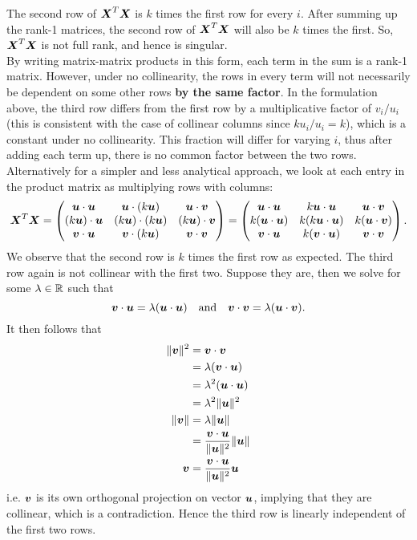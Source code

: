 \documentclass[12pt]{article}
\begin{document}
	The second row of $\boldsymbol{X}^T\boldsymbol{X}$ is $k$ times the first row for every $i$. After summing up the rank-1 matrices, the second row of $\boldsymbol{X}^T\boldsymbol{X}$ will also be $k$ times the first. So, $\boldsymbol{X}^T\boldsymbol{X}$ is not full rank, and hence is singular. \\
	
	By writing matrix-matrix products in this form, each term in the sum is a rank-1 matrix. However, under no collinearity, the rows in every term will not necessarily be dependent on some other rows \textbf{by the same factor}. In the formulation above, the third row differs from the first row by a multiplicative factor of $v_i/u_i$ (this is consistent with the case of collinear columns since $ku_i/u_i=k$), which is a constant under no collinearity. This fraction will differ for varying $i$, thus after adding each term up, there is no common factor between the two rows.\\
	
	Alternatively for a simpler and less analytical approach, we look at each entry in the product matrix as multiplying rows with columns:
	$$\boldsymbol{X}^T\boldsymbol{X}=\begin{pmatrix}
		\boldsymbol{u}\cdot\boldsymbol{u} & \boldsymbol{u}\cdot(k\boldsymbol{u}) & \boldsymbol{u}\cdot\boldsymbol{v}\\
		(k\boldsymbol{u})\cdot\boldsymbol{u} & (k\boldsymbol{u})\cdot(k\boldsymbol{u}) & (k\boldsymbol{u})\cdot\boldsymbol{v} \\
		\boldsymbol{v}\cdot\boldsymbol{u} & \boldsymbol{v}\cdot(k\boldsymbol{u}) & \boldsymbol{v}\cdot\boldsymbol{v}
	\end{pmatrix}=\begin{pmatrix}
		\boldsymbol{u}\cdot\boldsymbol{u} & k\boldsymbol{u}\cdot\boldsymbol{u} & \boldsymbol{u}\cdot\boldsymbol{v}\\
		k(\boldsymbol{u}\cdot\boldsymbol{u}) & k(k\boldsymbol{u}\cdot\boldsymbol{u}) & k(\boldsymbol{u}\cdot\boldsymbol{v}) \\
		\boldsymbol{v}\cdot\boldsymbol{u} & k(\boldsymbol{v}\cdot\boldsymbol{u}) & \boldsymbol{v}\cdot\boldsymbol{v}
	\end{pmatrix}.$$
	We observe that the second row is $k$ times the first row as expected. The third row again is not collinear with the first two. Suppose they are, then we solve for some $\lm\in\RR$ such that
	$$\boldsymbol{v}\cdot\boldsymbol{u}=\lambda(\boldsymbol{u}\cdot\boldsymbol{u}) \quad \text{and}\quad \boldsymbol{v}\cdot\boldsymbol{v}=\lambda(\boldsymbol{u}\cdot\boldsymbol{v}).$$
	It then follows that
	\begin{align*}
		\|\boldsymbol{v}\|^2&=\boldsymbol{v}\cdot\boldsymbol{v}\\
		&=\lambda(\boldsymbol{v}\cdot\boldsymbol{u})\\
		&=\lambda^2(\boldsymbol{u}\cdot\boldsymbol{u})\\
		&=\lambda^2\|\boldsymbol{u}\|^2\\ 
		\|\boldsymbol{v}\|&=\lambda\|\boldsymbol{u}\|\\
		&=\dfrac{\boldsymbol{v}\cdot\boldsymbol{u}}{\|\boldsymbol{u}\|^2}\|\boldsymbol{u}\|\\
		\boldsymbol{v}&=\dfrac{\boldsymbol{v}\cdot\boldsymbol{u}}{\|\boldsymbol{u}\|^2}\boldsymbol{u}
	\end{align*}
	i.e. $\boldsymbol{v}$ is its own orthogonal projection on vector $\boldsymbol{u}$, implying that they are collinear, which is a contradiction. Hence the third row is linearly independent of the first two rows. \\
	
\end{document}

